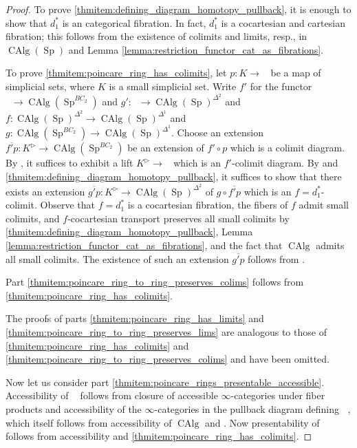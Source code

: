 \documentclass{article}
\DeclareMathOperator{\CAlg}{CAlg} %
\DeclareMathOperator{\CAlgp}{CAlg^p} %
\DeclareMathOperator{\Spectra}{Sp} %
\theoremstyle{definition}
\newcommand{\Lucy}[1]{\todo[color=cyan!30]{\linespread{1}\footnotesize L: #1}}
\begin{document}
\begin{proof}
    To prove \ref{thmitem:defining_diagram_homotopy_pullback}, it is enough to show that $d_1^*$ is an categorical fibration. 
    In fact, $ d_1^* $ is a cocartesian and cartesian fibration; this follows from the existence of colimits and limits, resp., in $ \CAlg(\Spectra) $ and Lemma \ref{lemma:restriction_functor_cat_as_fibrations}. 

    To prove \ref{thmitem:poincare_ring_has_colimits}, let $p:K\to \CAlgp$ be a map of simplicial sets, where $K$ is a small simplicial set. 
    Write $ f' $ for the functor $\CAlgp \to \CAlg(\Spectra^{BC_2})$ and $ g'\colon \CAlgp \to  \CAlg(\Spectra)^{\Delta^2} $ and $ f \colon \CAlg(\Spectra)^{\Delta^2} \to  \CAlg(\Spectra)^{\Delta^1} $ and $ g \colon \CAlg(\Spectra^{BC_2}) \to  \CAlg(\Spectra)^{\Delta^1} $. 
    Choose an extension $ \overline{f'p} \colon K^\vartriangleright\to \CAlg(\Spectra^{BC_2}) $ be an extension of $ f'\circ p $ which is a colimit diagram. 
    By \cite[Proposition 4.3.1.5(2)]{HTT}, it suffices to exhibit a lift $ K^\vartriangleright \to \CAlgp $ which is an $ f' $-colimit diagram. 
    By \cite[Prposition 4.3.1.5(4)]{HTT} and \ref{thmitem:defining_diagram_homotopy_pullback}, it suffices to show that there exists an extension $ \overline{g'p} \colon K^\vartriangleright \to \CAlg(\Spectra)^{\Delta^2} $ of $ g \circ \overline{f'p} $ which is an $ f=d_1^* $-colimit. 
    Observe that $ f= d_1^* $ is a cocartesian fibration, the fibers of $ f $ admit small colimits, and $ f $-cocartesian transport preserves all small colimits by \ref{thmitem:defining_diagram_homotopy_pullback}, Lemma \ref{lemma:restriction_functor_cat_as_fibrations}, and the fact that $ \CAlg $ admits all small colimits. 
    The existence of such an extension $ \overline{g'p} $ follows from \cite[Corollary 4.3.1.11]{HTT}. 

    Part \ref{thmitem:poincare_ring_to_ring_preserves_colims} follows from \ref{thmitem:poincare_ring_has_colimits}. 

    The proofs of parts \ref{thmitem:poincare_ring_has_limits} and \ref{thmitem:poincare_ring_to_ring_preserves_lims} are analogous to those of \ref{thmitem:poincare_ring_has_colimits} and \ref{thmitem:poincare_ring_to_ring_preserves_colims} and have been omitted.  

    Now let us consider part \ref{thmitem:poincare_rings_presentable_accessible}. 
    Accessibility of $ \CAlgp $ follows from closure of accessible $ \infty $-categories under fiber products \cite[Proposition 5.4.6.6]{HTT} and accessibility of the $ \infty $-categories in the pullback diagram defining $ \CAlgp $, which itself follows from accessibility of $ \CAlg $ and \cite[Proposition 5.4.4.3]{HTT}. 
    Now presentability of $ \CAlgp $ follows from accessibility and \ref{thmitem:poincare_ring_has_colimits}. 
\end{proof}
\end{document}
